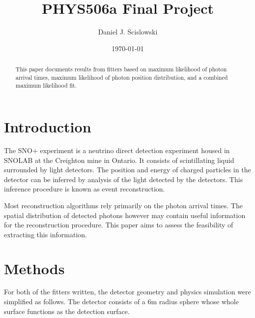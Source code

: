 \documentclass{article}
\begin{document}
\title{PHYS506a Final Project}
\date{\today}
\author{Daniel J. Scislowski}

\maketitle

\begin{abstract}
  This paper documents results from fitters based on maximum
  likelihood of photon arrival times, maximum likelihood of photon
  position distribution, and a combined maximum likelihood fit.
\end{abstract}

\section{Introduction}
\label{sec:intro}

The SNO+ experiment is a neutrino direct detection experiment housed
in SNOLAB at the Creighton mine in Ontario.  It consists of
scintillating liquid surrounded by light detectors.  The position and
energy of charged particles in the detector can be inferred by
analysis of the light detected by the detectors.  This inference
procedure is known as event reconstruction.

Most reconstruction algorithms rely primarily on the photon arrival
times.  The spatial distribution of detected photons however may
contain useful information for the reconstruction procedure.  This
paper aims to assess the feasibility of extracting this information.

\section{Methods}
\label{sec:methods}

For both of the fitters written, the detector geometry and physics
simulation were simplified as follows. The detector consists of a 6m
radius sphere whose whole surface functions as the detection surface.
\end{document}
